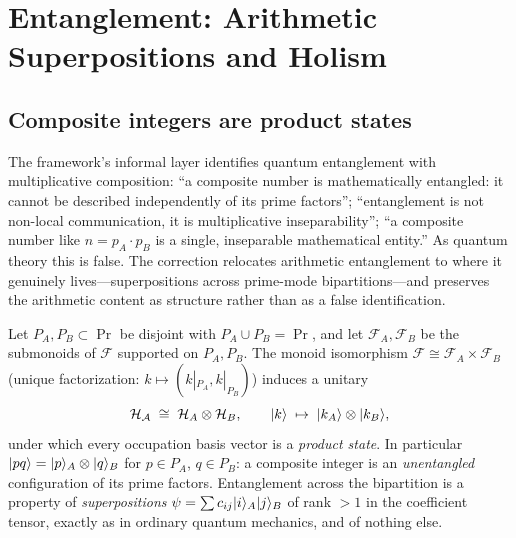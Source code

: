 
\section{Entanglement: Arithmetic Superpositions and Holism}\label{sec:entangle}

\subsection{Composite integers are product states}

The framework's informal layer identifies quantum entanglement with multiplicative
composition: ``a composite number is mathematically entangled: it cannot be described
independently of its prime factors''; ``entanglement is not non-local communication, it is
multiplicative inseparability''; ``a composite number like $n=p_{A}\cdot p_{B}$ is a single,
inseparable mathematical entity.'' As quantum theory this is false. The correction
relocates arithmetic entanglement to where it genuinely lives---superpositions across
prime-mode bipartitions---and preserves the arithmetic content as structure rather than as
a false identification.

\begin{theorem}\label{prop:productstructure}
Let $P_{A},P_{B}\subset\Pr$ be disjoint with $P_{A}\cup P_{B}=\Pr$, and let
$\mathcal{F}_{A},\mathcal{F}_{B}$ be the submonoids of $\mathcal{F}$ supported on
$P_{A},P_{B}$. The monoid isomorphism $\mathcal{F}\cong\mathcal{F}_{A}\times\mathcal{F}_{B}$
(unique factorization: $k\mapsto(k|_{P_{A}},k|_{P_{B}})$) induces a unitary
\begin{equation}
\mathcal{H}_{\mathcal{A}}\;\cong\;\mathcal{H}_{A}\otimes\mathcal{H}_{B},
\qquad
\lvert k\rangle\;\mapsto\;\lvert k_{A}\rangle\otimes\lvert k_{B}\rangle,
\end{equation}
under which every occupation basis vector is a \emph{product state}. In particular
$\lvert pq\rangle=\lvert p\rangle_{A}\otimes\lvert q\rangle_{B}$ for $p\in P_{A}$, $q\in P_{B}$: a composite integer
is an \emph{unentangled} configuration of its prime factors. Entanglement across the
bipartition is a property of \emph{superpositions}
$\psi=\sum c_{ij}\lvert i\rangle_{A}\lvert j\rangle_{B}$ of rank $>1$ in the coefficient tensor, exactly as
in ordinary quantum mechanics, and of nothing else.
\end{theorem}


